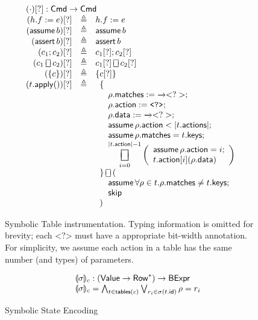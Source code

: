 \documentclass{article}
\newcommand{\Value}{\mathsf{Value}}
\newcommand{\BExpr}{\mathsf{BExpr}}
\newcommand{\Cmd}{\mathsf{Cmd}}
\newcommand{\Row}{\mathsf{Row}}
\newcommand{\matches}{\mathsf{matches}}
\newcommand{\action}{\mathsf{action}}
\newcommand{\actions}{\mathsf{actions}}
\newcommand{\keys}{\mathsf{keys}}
\newcommand{\data}{\mathsf{data}}
\newcommand{\id}{\mathsf{id}}
\newcommand{\assert}{\mathop{\mathsf{assert}}}
\newcommand{\assume}{\mathop{\mathsf{assume}}}
\newcommand{\apply}{\mathsf{apply}}
\newcommand{\choiceop}{\rotatebox[origin=c]{90}{$\sqsubset\!\!\!\sqsupset$}}
\newcommand{\choice}{\mathbin{\choiceop}}
\DeclareMathOperator*{\bigchoice}{\scalerel*{\choiceop}{\sum}}
\newcommand{\havoc}{\texttt{<?>}}
\newcommand{\SKIP}{\mathsf{skip}}
\newcommand{\state}[1]{\llparenthesis#1\rrparenthesis}
\newcommand{\tables}{\mathop{\mathsf{tables}}}
\begin{document}
\begin{figure}[htp]
  \[\begin{array}{r >{\triangleq}cl}
  \multicolumn{3}{l}{(\cdot)[?] : \Cmd \to \Cmd} \\
  (h.f := e)[?] && h.f := e \\
  (\assume b)[?] && \assume b \\
  (\assert b)[?] && \assert b\\
  (c_1;c_2)[?] && c_1[?];c_2[?]\\
  (c_1 \choice c_2)[?] && c_1[?] \choice c_2[?]\\
  (\{c\})[?] && \{c[?]\}\\
  (t.\apply())[?] &&
  \begin{array}[t]{l} \displaystyle
    \{ \\
    \quad \rho.\matches := \overrightarrow\havoc; \\
    \quad \rho.\action := \havoc;\\
    \quad \rho.\data := \overrightarrow\havoc; \\
    \quad \assume \rho.\action < |t.\actions|; \\
    \quad \assume \rho.\matches = t.\keys; \\
    \quad \displaystyle \bigchoice_{i=0}^{|t.\action| -1}
    \left(\begin{array}{l}
    \assume \rho.\action = i;\\
    t.\action[i](\rho.\data)
    \end{array}\right)\\
    \} \choice ( \\
    \quad \assume \forall \rho \in t. \rho.\matches \neq t.\keys; \\
    \quad \SKIP \\
    )
  \end{array}
  \end{array}
  \]
  \caption{Symbolic Table instrumentation. Typing information is omitted for
    brevity; each $\havoc$ must have a appropriate bit-width annotation. For
    simplicity, we assume each action in a table has the same number (and types) of
    parameters.}
  \label{fig:table-instrument}
\end{figure}

\begin{figure}[htp]
  \[\begin{array}{r >{\triangleq}cl}
  \multicolumn{3}{l}{\state\sigma_c : (\Value \to \Row^*) \to \BExpr} \\
  \state\sigma_c = \bigwedge_{ t \in \tables(c) } \bigvee_{r_i \in \sigma(t.\id)}
  \rho = r_i
  \end{array}
  \]
  \caption{Symbolic State Encoding}
  \label{fig:table-instrument}
\end{figure}
\end{document}
